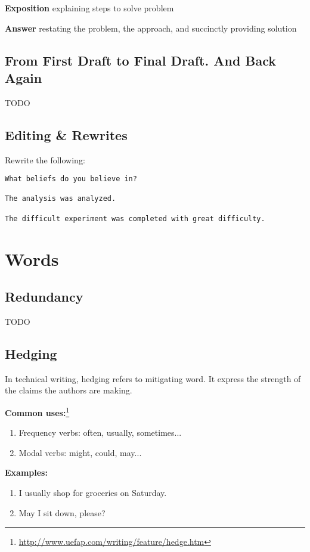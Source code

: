 \documentclass[10pt,a4paper]{book}
\begin{document}
\textbf{Exposition} explaining steps to solve problem

\textbf{Answer} restating the problem, the approach, and succinctly providing solution


\section{From First Draft to Final Draft. And Back Again}

\color{BrickRed}TODO\color{black}


\section{Editing \& Rewrites}

Rewrite the following:
\begin{verbatim}
What beliefs do you believe in?

The analysis was analyzed.

The difficult experiment was completed with great difficulty.
\end{verbatim}



\chapter{Words}



\section{Redundancy}\label{Redundancy}

\color{BrickRed}TODO\color{black}



\section{Hedging}\label{Hedging}

In technical writing, hedging refers to mitigating word. It express the strength of the claims the authors are making.

\textbf{Common uses:}\footnote{\url{http://www.uefap.com/writing/feature/hedge.htm}}
\begin{enumerate}
\item  Frequency verbs: often, usually, sometimes...
\item  Modal verbs: might, could, may...
\end{enumerate}
\textbf{Examples:}
\begin{enumerate}
\item I usually shop for groceries on Saturday.
\item May I sit down, please?
\end{enumerate}
\end{document}
